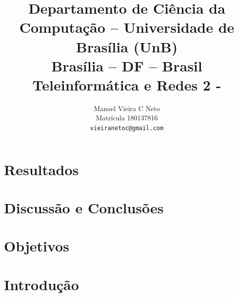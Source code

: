 \documentclass[10pt,twocolumn,letterpaper]{article}
\begin{document}
	
	
	
	\section{Resultados}
	
	
	\section{Discussão e Conclusões}
	
	{\small
		
		
	}
	
	
	\title{Departamento de Ciência da Computação -- Universidade de Brasília (UnB)\\
		Brasília -- DF -- Brasil\\
		Teleinformática e Redes 2 - \\
	}
	
	\author{
		Manoel Vieira C Neto\\ 
		Matrícula 180137816\\
		{\tt\small vieiranetoc@gmail.com}
		\and
	}
	\maketitle
	
	\begin{abstract}
		
		
	\end{abstract}
	
	\section{Objetivos}
	
	\section{Introdução}
	
	
	
	
\end{document}
